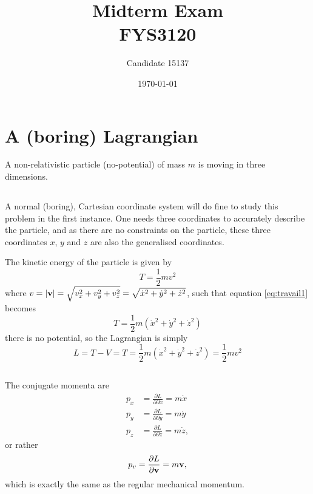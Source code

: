 \documentclass[11pt]{amsart}
\title[FYS3120 Midterm]{Midterm Exam\\	 
		\hrulefill \small{ FYS3120 } \hrulefill}
\author[15137]{Candidate 15137}
\date{\today}
\begin{document}
\maketitle

\section{A (boring) Lagrangian}
A non-relativistic particle (no-potential) of mass $m$ is moving in three dimensions.

\subsection{}
A normal (boring), Cartesian coordinate system will do fine to study this problem in the first instance. One needs three coordinates to accurately describe the particle, and as there are no constraints on the particle, these three coordinates $x$, $y$ and $z$ are also the generalised coordinates.

The kinetic energy of the particle is given by
\begin{equation}
\label{eq:travail1}
T = \frac{1}{2}mv^2
\end{equation}
where $v = \abs{\vb{v}} = \sqrt{v_x^2 + v_y^2 + v_z^2} = \sqrt{\dot{x}^2 + \dot{y}^2 + \dot{z}^2}$, such that equation \ref{eq:travail1} becomes
\begin{equation}
T = \frac{1}{2}m(\dot{x}^2 + \dot{y}^2 + \dot{z}^2)
\end{equation}
there is no potential, so the Lagrangian is simply
\begin{equation}
L = T - V = T = \frac{1}{2}m(\dot{x}^2 + \dot{y}^2 + \dot{z}^2) = \frac{1}{2}mv^2
\end{equation}

\subsection{}
The conjugate momenta are
\begin{align*}
p_x &= \frac{\partial L}{\partial \partial \dot{x}} = m\dot{x} \\
p_y &= \frac{\partial L}{\partial \partial \dot{y}} = m\dot{y} \\
p_z &= \frac{\partial L}{\partial \partial \dot{z}} = m\dot{z}, 
\end{align*}
or rather
\begin{equation}
p_v = \frac{\partial L}{\partial \vb{v}} = m\vb{v},
\end{equation}
which is exactly the same as the regular mechanical momentum.
\end{document}
